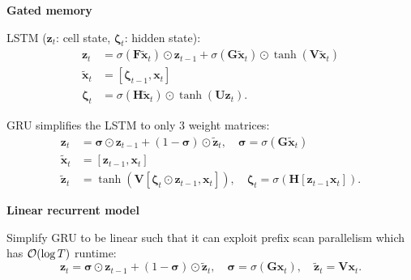 \documentclass[10pt]{article}
\newenvironment{topic}[1]
{\textbf{\sffamily \footnotesize \colorbox{black}{\rlap{\textbf{\textcolor{white}{#1}}}\hspace{\linewidth}\hspace{-2\fboxsep}}}}
{}
\newenvironment{subtopic}[1]
{\begin{center}\textbf{\footnotesize \sffamily #1}\end{center}}
{}
\renewcommand{\mat}[1]{\ensuremath{\mathbf{#1}}}
\renewcommand{\vec}[1]{\ensuremath{\mathbold{#1}}}
\begin{document}
\begin{multicols*}{3}
\begin{topic}{Recurrent neural networks}
\begin{subtopic}{Gated memory}
            LSTM ($\vec{z}_t$: cell state, $\vec{\zeta}_t$: hidden state):
            \begin{align*}
                \vec{z}_t         & = \sigma(\mat{F}\tilde{\vec{x}}_t) \odot \vec{z}_{t-1} + \sigma(\mat{G}\tilde{\vec{x}}_t) \odot \tanh(\mat{V}\tilde{\vec{x}}_t) \\
                \tilde{\vec{x}}_t & = [\vec{\zeta}_{t-1}, \vec{x}_t]                                                                                                \\
                \vec{\zeta}_t     & = \sigma(\mat{H}\tilde{\vec{x}}_t) \odot \tanh(\mat{U}\vec{z}_t).
            \end{align*}

            GRU simplifies the LSTM to only 3 weight matrices:
            \begin{align*}
                \vec{z}_t         & = \vec{\sigma} \odot \vec{z}_{t-1} + (1-\vec{\sigma}) \odot \tilde{\vec{z}}_t, \quad \vec{\sigma} = \sigma(\mat{G}\tilde{\vec{x}}_t) \\
                \tilde{\vec{x}}_t & = [\vec{z}_{t-1}, \vec{x}_t]                                                                                                         \\
                \tilde{\vec{z}}_t & = \tanh(\mat{V}[\vec{\zeta}_t \odot \vec{z}_{t-1}, \vec{x}_t]), \quad \vec{\zeta}_t = \sigma(\mat{H}[\vec{z}_{t-1} \vec{x}_t]).
            \end{align*}
        \end{subtopic}

        \begin{subtopic}{Linear recurrent model}
            Simplify GRU to be linear such that it can exploit prefix scan parallelism which has $\bigo{\log T}$ runtime: \[
                \vec{z}_t = \vec{\sigma} \odot \vec{z}_{t-1} + (1-\vec{\sigma}) \odot \tilde{\vec{z}}_t, \quad \vec{\sigma} = \sigma(\mat{G}\vec{x}_t), \quad \tilde{\vec{z}}_t = \mat{V}\vec{x}_t.
            \]


\end{subtopic}
\end{topic}
\end{multicols*}
\end{document}
